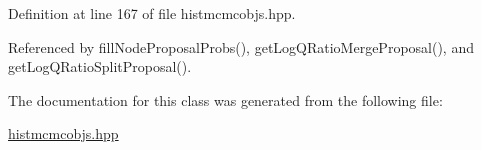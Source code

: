 \-Definition at line 167 of file histmcmcobjs.\-hpp.



\-Referenced by fill\-Node\-Proposal\-Probs(), get\-Log\-Q\-Ratio\-Merge\-Proposal(), and get\-Log\-Q\-Ratio\-Split\-Proposal().



\-The documentation for this class was generated from the following file\-:\begin{DoxyCompactItemize}
\item 
\hyperlink{histmcmcobjs_8hpp}{histmcmcobjs.\-hpp}\end{DoxyCompactItemize}
